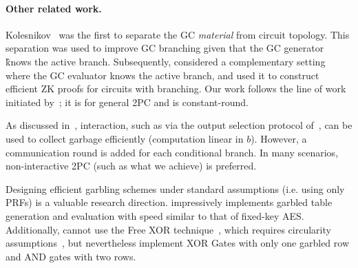 \paragraph{Other related work.}


Kolesnikov~\cite{AC:Kolesnikov18} was the first to separate the GC
{\em material} from circuit topology.
This separation was used to improve GC branching
given that the GC generator \G knows the active branch.
Subsequently, \cite{EC:HeaKol20} considered a complementary setting
where the GC evaluator \E knows the active branch, and used it to
construct efficient ZK proofs for circuits with branching.  Our work
follows the line of work initiated
by~\cite{AC:Kolesnikov18,EC:HeaKol20}; it is for general 2PC and is
constant-round.

As discussed in~\HK, interaction, such as via the output
selection protocol of~\cite{AC:Kolesnikov18}, can be used to collect
garbage efficiently (computation linear in $b$).
However, a communication round is added for each conditional branch.
In many scenarios, non-interactive 2PC (such as what we achieve) is preferred.

Designing efficient garbling schemes under standard assumptions (i.e.
using only PRFs) is a valuable research direction.
\cite{CCS:GLNP15} impressively implements garbled table
generation and evaluation with speed similar to that of
fixed-key AES.
Additionally, \cite{CCS:GLNP15} cannot use the Free XOR technique~\cite{ICALP:KolSch08}, which requires circularity
assumptions~\cite{TCC:CKKZ12}, but nevertheless implement XOR Gates
with only one garbled row and AND gates with two rows.
